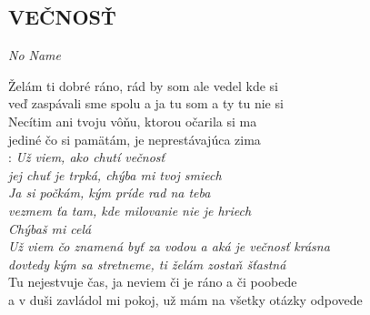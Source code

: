 \begin{flushleft}
	\section*{\Huge VEČNOSŤ}
	\emph{No Name}
\end{flushleft}

Želám ti dobré ráno, rád by som ale vedel kde si\\
veď zaspávali sme spolu 
a ja tu som a ty tu nie si\\

Necítim ani tvoju vôňu, ktorou očarila si ma\\ 
jediné čo si pamätám, je neprestávajúca zima\\ 

\textregistered: \emph{Už viem, ako chutí večnosť\\
jej chuť je trpká, chýba mi tvoj smiech \hspace{0.2cm} \\
Ja si počkám, kým príde rad na teba\\
vezmem ťa tam, kde milovanie nie je hriech \\
Chýbaš mi celá\\

Už viem čo znamená byť za vodou a aká je večnosť krásna\\
dovtedy kým sa stretneme, ti želám zostaň šťastná}\\

Tu nejestvuje čas, ja neviem či je ráno a či poobede \\
a v duši zavládol mi pokoj, už mám na všetky otázky odpovede\\

\textregistered\\

\newpage

